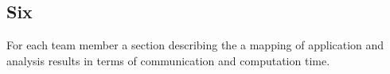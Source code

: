 \documentclass[final]{article}
\begin{document}
\subsection{Six}
For each team member a section describing the a mapping of application and analysis results in terms of communication and computation time.
\end{document}
